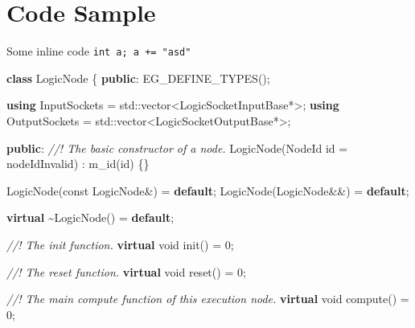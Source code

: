 \documentclass[
  british,
  12pt,
  paper=a4,
  twoside,
  titlepage=true,
  openright,
  abstract=on,
  toc=listofnumbered,
  numbers=noenddot,
  chapterprefix=true,
  headings=optiontohead,
  svgnames,
  dvipsnames]{scrreprt}
\newenvironment{Shaded}{}{}
\newcommand{\AttributeTok}[1]{\textcolor[rgb]{0.49,0.56,0.16}{#1}}
\newcommand{\BuiltInTok}[1]{#1}
\newcommand{\CommentTok}[1]{\textcolor[rgb]{0.38,0.63,0.69}{\textit{#1}}}
\newcommand{\ControlFlowTok}[1]{\textcolor[rgb]{0.00,0.44,0.13}{\textbf{#1}}}
\newcommand{\DataTypeTok}[1]{\textcolor[rgb]{0.56,0.13,0.00}{#1}}
\newcommand{\DecValTok}[1]{\textcolor[rgb]{0.25,0.63,0.44}{#1}}
\newcommand{\KeywordTok}[1]{\textcolor[rgb]{0.00,0.44,0.13}{\textbf{#1}}}
\newcommand{\NormalTok}[1]{#1}
\newcommand{\OperatorTok}[1]{\textcolor[rgb]{0.40,0.40,0.40}{#1}}
\newcommand{\VariableTok}[1]{\textcolor[rgb]{0.10,0.09,0.49}{#1}}
\begin{document}
\hypertarget{code-sample}{%
\section{Code Sample}\label{code-sample}}

Some inline code \texttt{int\ a;\ a\ +=\ "asd"}

\begin{Shaded}
\begin{Highlighting}[numbers=left,,]
\KeywordTok{class}\NormalTok{ LogicNode}
\OperatorTok{\{}
\KeywordTok{public}\OperatorTok{:}
\NormalTok{    EG\_DEFINE\_TYPES}\OperatorTok{();}

    \KeywordTok{using}\NormalTok{ InputSockets  }\OperatorTok{=} \BuiltInTok{std::}\NormalTok{vector}\OperatorTok{\textless{}}\NormalTok{LogicSocketInputBase}\OperatorTok{*\textgreater{};}
    \KeywordTok{using}\NormalTok{ OutputSockets }\OperatorTok{=} \BuiltInTok{std::}\NormalTok{vector}\OperatorTok{\textless{}}\NormalTok{LogicSocketOutputBase}\OperatorTok{*\textgreater{};}

\KeywordTok{public}\OperatorTok{:}
    \CommentTok{//! The basic constructor of a node.}
\NormalTok{    LogicNode}\OperatorTok{(}\NormalTok{NodeId id }\OperatorTok{=}\NormalTok{ nodeIdInvalid}\OperatorTok{)}
        \OperatorTok{:} \VariableTok{m\_id}\OperatorTok{(}\NormalTok{id}\OperatorTok{)}
    \OperatorTok{\{\}}

\NormalTok{    LogicNode}\OperatorTok{(}\AttributeTok{const}\NormalTok{ LogicNode}\OperatorTok{\&)} \OperatorTok{=} \ControlFlowTok{default}\OperatorTok{;}
\NormalTok{    LogicNode}\OperatorTok{(}\NormalTok{LogicNode}\OperatorTok{\&\&)}      \OperatorTok{=} \ControlFlowTok{default}\OperatorTok{;}

    \KeywordTok{virtual} \OperatorTok{\textasciitilde{}}\NormalTok{LogicNode}\OperatorTok{()} \OperatorTok{=} \ControlFlowTok{default}\OperatorTok{;}

    \CommentTok{//! The init function.}
    \KeywordTok{virtual} \DataTypeTok{void}\NormalTok{ init}\OperatorTok{()} \OperatorTok{=} \DecValTok{0}\OperatorTok{;}

    \CommentTok{//! The reset function.}
    \KeywordTok{virtual} \DataTypeTok{void}\NormalTok{ reset}\OperatorTok{()} \OperatorTok{=} \DecValTok{0}\OperatorTok{;}

    \CommentTok{//! The main compute function of this execution node.}
    \KeywordTok{virtual} \DataTypeTok{void}\NormalTok{ compute}\OperatorTok{()} \OperatorTok{=} \DecValTok{0}\OperatorTok{;}


\end{Highlighting}
\end{Shaded}
\end{document}
